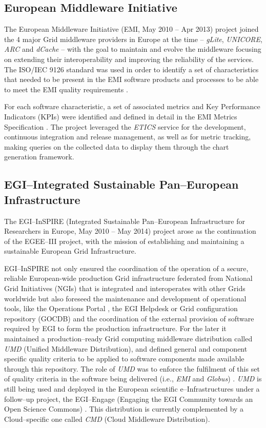 \documentclass[journal]{IEEEtran}
\begin{document}
\subsection{European Middleware Initiative}

The European Middleware Initiative (EMI, May 2010 -- Apr 2013)
\cite{cordis:emi} project joined the 4 major Grid middleware providers in
Europe at the time -- {\sl gLite}, {\sl UNICORE}, {\sl ARC} and {\sl dCache} --
with the goal to maintain and evolve the middleware focusing on extending their
interoperability and improving the reliability of the services. The
ISO/IEC 9126 \cite{iso-9126} standard was used in order to identify a set of
characteristics that needed to be present in the EMI software products and
processes to be able to meet the EMI quality requirements
\cite{emi-quality-model}.

For each software characteristic, a set of associated
metrics and Key Performance Indicators (KPIs) were identified and defined in
detail in the EMI Metrics Specification \cite{emi-metrics}. The project
leveraged the {\sl ETICS} service for the development, continuous integration and release management,
as well as for metric tracking, making queries on the collected data to display
them through the chart generation framework.

\subsection{EGI--Integrated Sustainable Pan--European Infrastructure}

The EGI--InSPIRE (Integrated Sustainable Pan--European Infrastructure for
Researchers in Europe, May 2010 -- May 2014) project \cite{cordis:egi-inspire}
arose as the continuation of the EGEE--III project, with the mission of establishing and
maintaining a sustainable European Grid Infrastructure.


EGI--InSPIRE not only ensured the coordination of the operation of a secure, reliable 
European-wide production Grid infrastructure federated from National Grid Initiatives (NGIs)
that is integrated and interoperates with other Grids worldwide but also foreseed the 
maintenance and development of operational tools, like the Operations Portal \cite{egi-ops}, 
the EGI Helpdesk \cite{ggus} or Grid configuration repository (GOCDB) \cite{gocdb} and the 
coordination of the external provision of software required by EGI to 
form the production infrastructure. For the later it maintained a production--ready 
Grid computing middleware distribution called {\sl UMD} (Unified Middleware Distribution), and 
defined general and component specific quality criteria to be applied to software 
components made available through this repository.
The role of {\sl UMD} was to enforce the fulfilment of this set of quality
criteria \cite{egi-qc} in the software being delivered (i.e.,
{\sl EMI} and {\sl Globus}) \cite{mario}. {\sl UMD} is still being used and
deployed in the European scientific e--Infrastructures under a follow--up
project, the EGI--Engage (Engaging the EGI Community towards an Open Science
Commons) \cite{cordis:egi-engage}. This distribution is currently complemented
by a Cloud--specific one called {\sl CMD} (Cloud Middleware Distribution).
\end{document}
